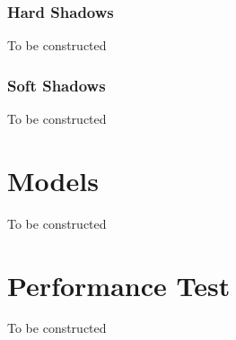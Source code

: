 \documentclass{article}
\begin{document}
    \subsubsection{Hard Shadows}
    To be constructed

    \subsubsection{Soft Shadows}
    To be constructed

    \section{Models}
    To be constructed

    \section{Performance Test}
    To be constructed
\end{document}
